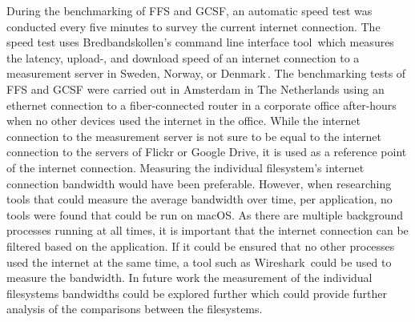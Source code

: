 During the benchmarking of \gls{FFS} and \gls{GCSF}, an automatic speed test was conducted every five minutes to survey the current internet connection. The speed test uses Bredbandskollen's command line interface tool\,\cite{internetstiftelsenBredbandskollenCLIBredbandskollen} which measures the latency, upload-, and download speed of an internet connection to a measurement server in Sweden, Norway, or Denmark\,\cite{internetstiftelsenMerOmBredbandskollen}. The benchmarking tests of \gls{FFS} and \gls{GCSF} were carried out in Amsterdam in The Netherlands using an ethernet connection to a \mbox{fiber-connected} router in a corporate office after-hours when no other devices used the internet in the office. While the internet connection to the measurement server is not sure to be equal to the internet connection to the servers of Flickr or Google Drive, it is used as a reference point of the internet connection. Measuring the individual filesystem's internet connection bandwidth would have been preferable. However, when researching tools that could measure the average bandwidth over time, per application, no tools were found that could be run on macOS. As there are multiple background processes running at all times, it is important that the internet connection can be filtered based on the application. If it could be ensured that no other processes used the internet at the same time, a tool such as Wireshark\,\cite{WiresharkGoDeep} could be used to measure the bandwidth. In future work the measurement of the individual filesystems bandwidths could be explored further which could provide further analysis of the comparisons between the filesystems.